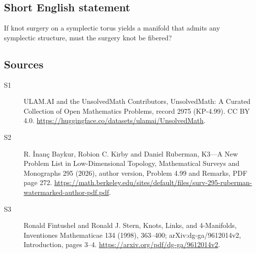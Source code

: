 \documentclass[11pt]{article}
\begin{document}
\subsection{Short English statement}
If knot surgery on a symplectic torus yields a manifold that admits any symplectic structure, must the surgery knot be fibered?
\subsection{Sources}
\begin{description}
\item[\hypertarget{source:2975:1}{S1}] ULAM.AI and the UnsolvedMath Contributors, UnsolvedMath: A Curated Collection of Open Mathematics Problems, record 2975 (KP-4.99). CC BY 4.0. \url{https://huggingface.co/datasets/ulamai/UnsolvedMath}.
\item[\hypertarget{source:2975:2}{S2}] R. İnanç Baykur, Robion C. Kirby and Daniel Ruberman, K3—A New Problem List in Low-Dimensional Topology, Mathematical Surveys and Monographs 295 (2026), author version, Problem 4.99 and Remarks, PDF page 272. \url{https://math.berkeley.edu/sites/default/files/surv-295-ruberman-watermarked-author-pdf.pdf}.
\item[\hypertarget{source:2975:3}{S3}] Ronald Fintushel and Ronald J. Stern, Knots, Links, and 4-Manifolds, Inventiones Mathematicae 134 (1998), 363--400; arXiv:dg-ga/9612014v2, Introduction, pages 3--4. \url{https://arxiv.org/pdf/dg-ga/9612014v2}.
\end{description}
\label{end:2975}
\end{document}
